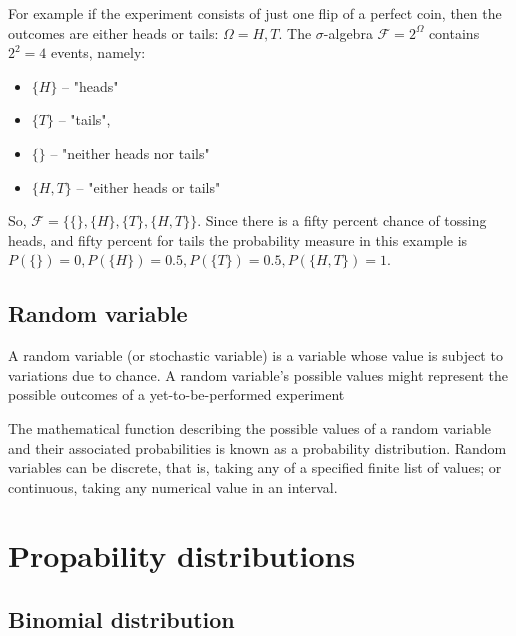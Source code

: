 For example if the experiment consists of just one flip of a perfect coin, then the outcomes are either heads or tails: $\Omega = {H, T}$. The $\sigma$-algebra $\mathcal{F} = 2^{\Omega}$ contains $2^2 = 4$ events, namely:
\begin{itemize}
\item $\{H\}$ – "heads"
\item $\{T\}$ – "tails",
\item $\{\}$ – "neither heads nor tails"
\item $\{H,T\}$ – "either heads or tails"
\end{itemize}
So, $\mathcal{F} = \{\{\}, \{H\}, \{T\}, \{H,T\}\}$. Since there is a fifty percent chance of tossing heads, and fifty percent for tails the probability measure in this example is $P(\{\}) = 0, P(\{H\}) = 0.5, P(\{T\}) = 0.5, P(\{H,T\}) = 1$.

\subsection{Random variable}
A random variable (or stochastic variable) is a variable whose value is subject to variations due to chance. A random variable's possible values might represent the possible outcomes of a yet-to-be-performed experiment

The mathematical function describing the possible values of a random variable and their associated probabilities is known as a probability distribution. Random variables can be discrete, that is, taking any of a specified finite list of values; or continuous, taking any numerical value in an interval.

\section{Propability distributions}
\subsection{Binomial distribution}
